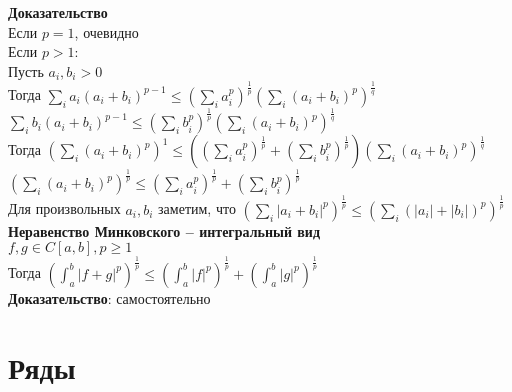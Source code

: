 \documentclass[12pt]{article}
\begin{document}
\textbf{Доказательство}\\
Если $p = 1$, очевидно\\
Если $p > 1$:\\
Пусть $a_i, b_i > 0$\\
Тогда $\sum_i a_i (a_i + b_i)^{p-1} \leq (\sum_i a_i^p)^{\frac1p}(\sum_i (a_i + b_i)^p)^{\frac1q}$\\
$\sum_i b_i (a_i + b_i)^{p-1} \leq (\sum_i b_i^p)^{\frac1p}(\sum_i (a_i + b_i)^p)^{\frac1q}$\\
Тогда $(\sum_i (a_i+b_i)^p)^1 \leq ((\sum_i a_i^p)^{\frac1p} + (\sum_i b_i^p)^{\frac1p})(\sum_i (a_i + b_i)^p)^{\frac1q}$\\
$(\sum_i (a_i+b_i)^p)^{\frac1p} \leq (\sum_i a_i^p)^{\frac1p} + (\sum_i b_i^p)^{\frac1p}$\\
Для произвольных $a_i, b_i$ заметим, что $(\sum_i |a_i+b_i|^p)^{\frac1p} \leq (\sum_i (|a_i|+|b_i|)^p)^{\frac1p}$\\
\textbf{Неравенство Минковского -- интегральный вид}\\
$f,g \in C[a,b], p\geq 1$\\
Тогда $(\int_a^b |f+g|^p)^{\frac1p} \leq (\int_a^b |f|^p)^{\frac1p} + (\int_a^b |g|^p)^{\frac1p}$\\
\textbf{Доказательство}: самостоятельно
\section{Ряды}
\end{document}
